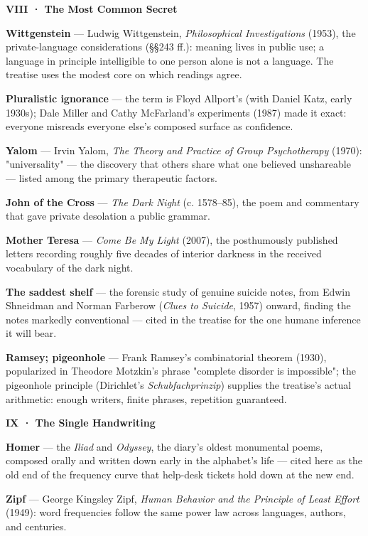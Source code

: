 \documentclass[11pt]{article}
\begin{document}
\textbf{VIII · The Most Common Secret}

\textbf{Wittgenstein} — Ludwig Wittgenstein, \emph{Philosophical Investigations} (1953), the private-language considerations (§§243 ff.): meaning lives in public use; a language in principle intelligible to one person alone is not a language. The treatise uses the modest core on which readings agree.

\textbf{Pluralistic ignorance} — the term is Floyd Allport's (with Daniel Katz, early 1930s); Dale Miller and Cathy McFarland's experiments (1987) made it exact: everyone misreads everyone else's composed surface as confidence.

\textbf{Yalom} — Irvin Yalom, \emph{The Theory and Practice of Group Psychotherapy} (1970): "universality" — the discovery that others share what one believed unshareable — listed among the primary therapeutic factors.

\textbf{John of the Cross} — \emph{The Dark Night} (c. 1578–85), the poem and commentary that gave private desolation a public grammar.

\textbf{Mother Teresa} — \emph{Come Be My Light} (2007), the posthumously published letters recording roughly five decades of interior darkness in the received vocabulary of the dark night.

\textbf{The saddest shelf} — the forensic study of genuine suicide notes, from Edwin Shneidman and Norman Farberow (\emph{Clues to Suicide}, 1957) onward, finding the notes markedly conventional — cited in the treatise for the one humane inference it will bear.

\textbf{Ramsey; pigeonhole} — Frank Ramsey's combinatorial theorem (1930), popularized in Theodore Motzkin's phrase "complete disorder is impossible"; the pigeonhole principle (Dirichlet's \emph{Schubfachprinzip}) supplies the treatise's actual arithmetic: enough writers, finite phrases, repetition guaranteed.

\textbf{IX · The Single Handwriting}

\textbf{Homer} — the \emph{Iliad} and \emph{Odyssey}, the diary's oldest monumental poems, composed orally and written down early in the alphabet's life — cited here as the old end of the frequency curve that help-desk tickets hold down at the new end.

\textbf{Zipf} — George Kingsley Zipf, \emph{Human Behavior and the Principle of Least Effort} (1949): word frequencies follow the same power law across languages, authors, and centuries.
\end{document}
